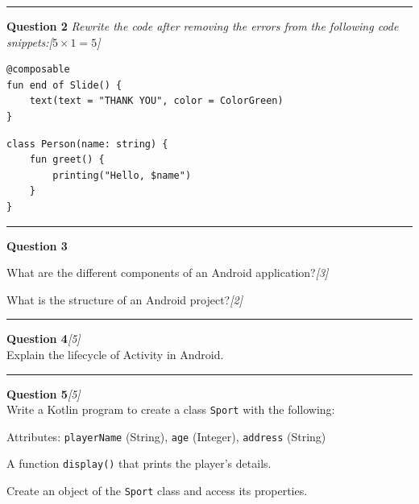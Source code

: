 \documentclass[11pt,a4paper]{article}
\newcommand{\pts}[1]{\hfill   \textit{[#1]}}
\begin{document}
\medskip\rule{\linewidth}{0.2pt}\medskip




\noindent   \textbf{Question 2}   \textit{Rewrite the code after removing the errors from the following code snippets:}\pts{$5  \times 1 = 5$}

\begin{parts}
  \item 

\begin{lstlisting}
@composable
fun end of Slide() {
    text(text = "THANK YOU", color = ColorGreen)
}
\end{lstlisting}

  \item 

\begin{lstlisting}
class Person(name: string) {
    fun greet() {
        printing("Hello, $name")
    }
}
\end{lstlisting}
\end{parts}

\medskip\rule{\linewidth}{0.2pt}\medskip




\noindent   \textbf{Question 3}

\begin{parts}
  \item What are the different components of an Android application?\pts{3}
  \item What is the structure of an Android project?\pts{2}
\end{parts}

\medskip\rule{\linewidth}{0.2pt}\medskip




\noindent   \textbf{Question 4}\pts{5} \\
Explain the lifecycle of Activity in Android.

\medskip\rule{\linewidth}{0.2pt}\medskip




\noindent   \textbf{Question 5}\pts{5} \\
Write a Kotlin program to create a class   \texttt{Sport} with the following:

\begin{parts}
  \item Attributes:   \texttt{playerName} (String),   \texttt{age} (Integer),   \texttt{address} (String)
  \item A function   \texttt{display()} that prints the player's details.
  \item Create an object of the   \texttt{Sport} class and access its properties.
\end{parts}
\end{document}
